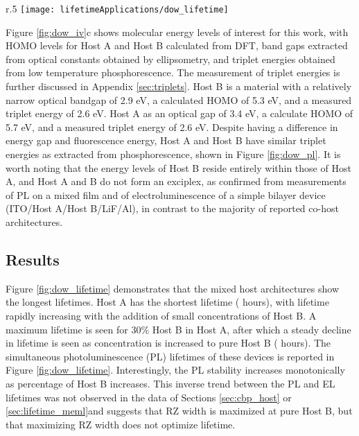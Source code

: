 \documentclass[../thesis.tex]{subfiles}
\begin{document}
\begin{wrapfigure}{r}{.5\textwidth}
\centering
\texttt{[image: lifetimeApplications/dow\_lifetime]}
\caption{(a) Overal EL and PL loss for selected architectures.  (b) Extracted lifetimes as a function of concentration.}
\label{fig:dow_lifetime}
\end{wrapfigure}

Figure \ref{fig:dow_iv}c shows molecular energy levels of interest for this work, with HOMO levels for Host A and Host B calculated from DFT, band gaps extracted from optical constants obtained by ellipsometry, and triplet energies obtained from low temperature phosphorescence.  
The measurement of triplet energies is further discussed in Appendix \ref{sec:triplets}.
Host B is a material with a relatively narrow optical bandgap of 2.9 eV, a calculated HOMO of 5.3 eV, and a measured triplet energy of 2.6 eV. 
Host A as an optical gap of 3.4 eV, a calculate HOMO of 5.7 eV, and a measured triplet energy of 2.6 eV. 
Despite having a difference in energy gap and fluorescence energy, Host A and Host B have similar triplet energies as extracted from phosphorescence, shown in Figure \ref{fig:dow_pl}.
It is worth noting that the energy levels of Host B reside entirely within those of Host A, and Host A and B do not form an exciplex, as confirmed from measurements of PL on a mixed film and of electroluminescence of a simple bilayer device (ITO/Host A/Host B/LiF/Al), in contrast to the majority of reported co-host architectures. 


\subsection{Results}
Figure \ref{fig:dow_lifetime} demonstrates that the mixed host architectures show the longest lifetimes. 
Host A has the shortest lifetime ( hours), with lifetime rapidly increasing with the addition of small concentrations of Host B. 
A maximum lifetime is seen for 30\% Host B in Host A, after which a steady decline in lifetime is seen as concentration is increased to pure Host B ( hours). 
The simultaneous photoluminescence (PL) lifetimes of these devices is reported in Figure \ref{fig:dow_lifetime}. 
Interestingly, the PL stability increases monotonically as percentage of Host B increases. 
This inverse trend between the PL and EL lifetimes was not observed in the data of Sections \ref{sec:cbp_host} or \ref{sec:lifetime_meml}and suggests that RZ width is maximized at pure Host B, but that maximizing RZ width does not optimize lifetime.
\end{document}

